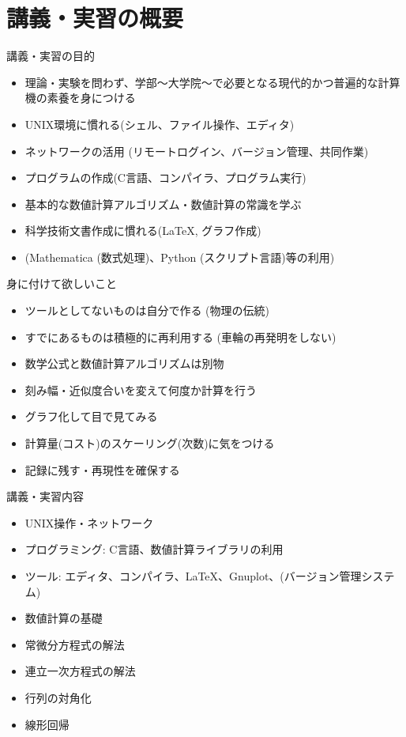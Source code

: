 \section{講義・実習の概要}

\begin{frame}[t]{講義・実習の目的}
  \begin{itemize}
  \item 理論・実験を問わず、学部〜大学院〜で必要となる現代的かつ普遍的な計算機の素養を身につける
  \item UNIX環境に慣れる(シェル、ファイル操作、エディタ)
  \item ネットワークの活用 (リモートログイン、バージョン管理、共同作業)
  \item プログラムの作成(C言語、コンパイラ、プログラム実行)
  \item 基本的な数値計算アルゴリズム・数値計算の常識を学ぶ
  \item 科学技術文書作成に慣れる(\LaTeX, グラフ作成)
  \item (Mathematica (数式処理)、Python (スクリプト言語)等の利用)
  \end{itemize}
\end{frame}

\begin{frame}[t]{身に付けて欲しいこと}
  \begin{itemize}
  \item ツールとしてないものは自分で作る (物理の伝統)
  \item すでにあるものは積極的に再利用する (車輪の再発明をしない)
  \item 数学公式と数値計算アルゴリズムは別物
  \item 刻み幅・近似度合いを変えて何度か計算を行う
  \item グラフ化して目で見てみる
  \item 計算量(コスト)のスケーリング(次数)に気をつける
  \item 記録に残す・再現性を確保する
  \end{itemize}
\end{frame}

\begin{frame}[t]{講義・実習内容}
  \begin{itemize}
  \item UNIX操作・ネットワーク
  \item プログラミング: C言語、数値計算ライブラリの利用
  \item ツール: エディタ、コンパイラ、\LaTeX、Gnuplot、(バージョン管理システム)
  \item 数値計算の基礎
  \item 常微分方程式の解法
  \item 連立一次方程式の解法
  \item 行列の対角化
  \item 線形回帰
  \end{itemize}
\end{frame}

